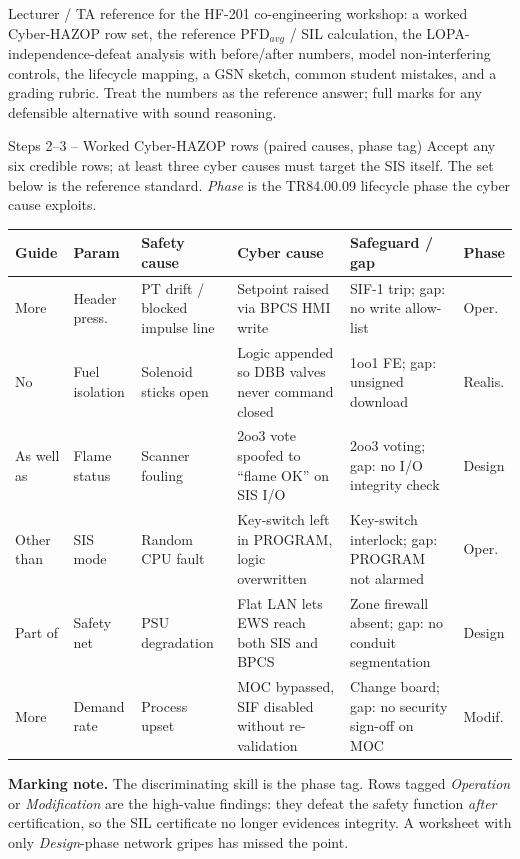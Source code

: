 \documentclass[11pt,a4paper]{article}
\begin{document}
\labheader

\begin{goalbox}
Lecturer / TA reference for the HF-201 co-engineering workshop: a worked
Cyber-HAZOP row set, the reference $\mathrm{PFD}_{avg}$ / SIL calculation,
the LOPA-independence-defeat analysis with before/after numbers, model
non-interfering controls, the lifecycle mapping, a GSN sketch, common
student mistakes, and a grading rubric. Treat the numbers as the reference
answer; full marks for any defensible alternative with sound reasoning.
\end{goalbox}

\begin{solutionbox}{Steps 2--3 -- Worked Cyber-HAZOP rows (paired causes, phase tag)}
Accept any six credible rows; at least three cyber causes must target the SIS
itself. The set below is the reference standard. \emph{Phase} is the
TR84.00.09 lifecycle phase the cyber cause exploits.

\vspace{2pt}\footnotesize
\renewcommand{\arraystretch}{1.25}\setlength{\tabcolsep}{3pt}
\begin{tabular}{@{}p{10mm}p{14mm}p{32mm}p{36mm}p{32mm}p{14mm}@{}}
\toprule
\textbf{Guide} & \textbf{Param} & \textbf{Safety cause} & \textbf{Cyber cause} & \textbf{Safeguard / gap} & \textbf{Phase} \\
\midrule
More & Header press. & PT drift / blocked impulse line & Setpoint raised via BPCS HMI write & SIF-1 trip; gap: no write allow-list & Oper. \\
No   & Fuel isolation & Solenoid sticks open & Logic appended so DBB valves never command closed & 1oo1 FE; gap: unsigned download & Realis. \\
As well as & Flame status & Scanner fouling & 2oo3 vote spoofed to ``flame OK'' on SIS I/O & 2oo3 voting; gap: no I/O integrity check & Design \\
Other than & SIS mode & Random CPU fault & Key-switch left in PROGRAM, logic overwritten & Key-switch interlock; gap: PROGRAM not alarmed & Oper. \\
Part of & Safety net & PSU degradation & Flat LAN lets EWS reach both SIS and BPCS & Zone firewall absent; gap: no conduit segmentation & Design \\
More & Demand rate & Process upset & MOC bypassed, SIF disabled without re-validation & Change board; gap: no security sign-off on MOC & Modif. \\
\bottomrule
\end{tabular}
\normalsize

\par\vspace{2mm}
\textbf{Marking note.} The discriminating skill is the phase tag. Rows tagged
\emph{Operation} or \emph{Modification} are the high-value findings: they
defeat the safety function \emph{after} certification, so the SIL certificate
no longer evidences integrity. A worksheet with only \emph{Design}-phase
network gripes has missed the point.
\end{solutionbox}
\end{document}
